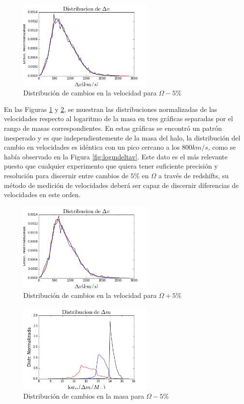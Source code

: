 \begin{figure}[h]
\centering
\includegraphics[width=0.6\textwidth]{Trabajo/deltavmenos}
\caption{Distribución de cambios en la velocidad para $\Omega-5\%$}
\label{fig:deltavmenos}
\end{figure}
En las Figuras \ref{fig:deltavmenos} y \ref{fig:deltavmas}, se muestran las distribuciones normalizadas de las velocidades respecto al logaritmo de la masa en tres gráficas separadas por el rango de masas correspondientes. En estas gráficas se encontró un patrón inesperado y es que independientemente de la masa del halo, la distribución del cambio en velocidades es idéntica con un pico cercano a los $800km/s$, como se había observado en la Figura \ref{fig:logmdeltav}. Este dato es el más relevante puesto que cualquier experimento que quiera tener suficiente precisión y resolución para discernir entre cambios de $5\%$ en $\Omega$ a través de redshifts, su método de medición de velocidades deberá ser capaz de discernir diferencias de velocidades en este orden.

\begin{figure}[h]
\centering
\includegraphics[width=0.6\textwidth]{Trabajo/deltavmas}
\caption{Distribución de cambios en la velocidad para $\Omega+5\%$}
\label{fig:deltavmas}
\end{figure}

\begin{figure}[h]
\centering
\includegraphics[width=0.6\textwidth]{Trabajo/deltammenos}
\caption{Distribución de cambios en la masa para $\Omega-5\%$}
\label{fig:deltammenos}
\end{figure}

